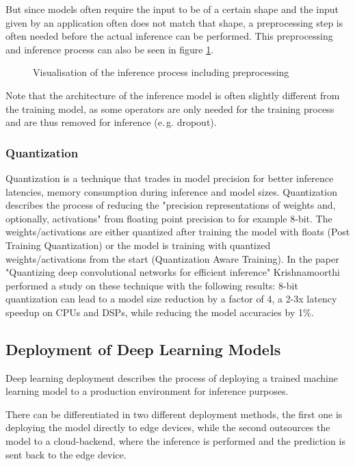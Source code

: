 But since models often require the input to be of a certain shape and the input given by an application often does not match that shape, a preprocessing step is often needed before the actual inference can be performed.
This preprocessing and inference process can also be seen in figure \ref{fig:InfProcess}.
\begin{figure}[H]
\centering

\caption{Visualisation of the inference process including preprocessing}
\label{fig:InfProcess}
\end{figure}
Note that the architecture of the inference model is often slightly different from the training model, as some operators are only needed for the training process and are thus removed for inference (e.\,g. dropout).






\subsubsection{Quantization}
\label{chap:quant}
Quantization is a technique that trades in model precision for better inference latencies, memory consumption during inference and model sizes.
Quantization describes the process of reducing the "precision representations of weights and, optionally, activations" \cite{tfLiteQuant} from floating point precision to for example 8-bit.
The weights/activations are either quantized after training the model with floats (Post Training Quantization) or the model is training with quantized weights/activations from the start (Quantization Aware Training). In the paper "Quantizing deep convolutional networks for
efficient inference"\cite{Quantizing} Krishnamoorthi performed a study on these technique with the following results:
8-bit quantization can lead to a model size reduction by a factor of 4, a 2-3x latency speedup on CPUs and DSPs, while reducing the model accuracies by 1\%.


\subsection{Deployment of Deep Learning Models}
Deep learning deployment describes the process of deploying a trained machine learning model to a production environment for inference purposes. 

There can be differentiated in two different deployment methods, the first one is deploying the model directly to edge devices, while the second outsources the model to a cloud-backend, where the inference is performed and the prediction is sent back to the edge device.
